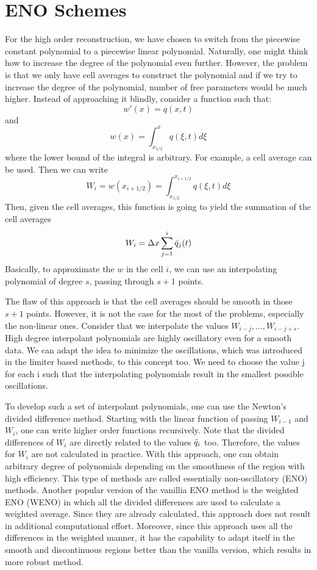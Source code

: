 \documentclass[journal,onecolumn]{IEEEtran}
\begin{document}
\section{ENO Schemes}
For the high order reconstruction, we have chosen to switch from the piecewise constant polynomial to a piecewise linear polynomial. Naturally, one might think how to increase the degree of the polynomial even further. However, the problem is that we only have cell averages to construct the polynomial and if we try to increase the degree of the polynomial, number of free parameters would be much higher. Instead of approaching it blindly, consider a function such that:
$$
    w'(x) = q(x,t)
$$
and
$$ 
w(x) = \int_{x_{1/2}}^x q(\xi, t)d\xi
$$
where the lower bound of the integral is arbitrary. For example, a cell average can be used. Then we can write
$$
W_i = w(x_{i+1/2}) = \int_{x_{1/2}}^{x_{i + 1/2}} q(\xi, t)d\xi
$$
Then, given the cell averages, this function is going to yield the summation of the cell averages
$$
W_i = \Delta x \sum^i_{j=1} \Bar{q}_j (t)
$$
Basically, to approximate the $w$ in the cell $i$, we can use an interpolating polynomial of degree $s$, passing through $s+1$ points. 
\par
The flaw of this approach is that the cell averages should be smooth in those $s+1$ points. However, it is not the case for the most of the problems, especially the non-linear ones. Consider that we interpolate the values $W_{i-j},...,W_{i-j+s}$. High degree interpolant polynomials are highly oscillatory even for a smooth data. We can adapt the idea to minimize the oscillations, which was introduced in the limiter based methods, to this concept too. We need to choose the value j for each i such that the interpolating polynomials result in the smallest possible oscillations.
\par
To develop such a set of interpolant polynomials, one can use the Newton's divided difference method. Starting with the linear function of passing $W_{i-1}$ and $W_{i}$, one can write higher order functions recursively. Note that the divided differences of $W_i$ are directly related to the values $\Bar{q}_i$ too. Therefore, the values for $W_i$ are not calculated in practice. With this approach, one can obtain  arbitrary degree of polynomials depending on the smoothness of the region with high efficiency. This type of methods are called essentially non-oscillatory (ENO) methods. Another popular version of the vanillia ENO method is the weighted ENO (WENO) in which all the divided differences are used to calculate a weighted average. Since they are already calculated, this approach does not result in additional computational effort. Moreover, since this approach uses all the differences in the weighted manner, it has the capability to adapt itself in the smooth and discontinuous regions better than the vanilla version, which results in more robust method.
\end{document}
